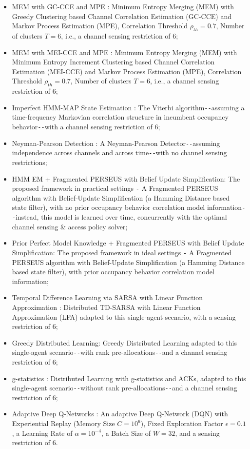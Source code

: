 \documentclass[12pt, draftcls, onecolumn]{IEEEtran}
\begin{document}
\begin{itemize}
    \item MEM with GC-CCE and MPE \cite{WCL:7}: Minimum Entropy Merging (MEM) with Greedy Clustering based Channel Correlation Estimation (GC-CCE) and Markov Process Estimation (MPE), Correlation Threshold $\rho_{th}{=}0.7$, Number of clusters $T{=}6$, i.e., a channel sensing restriction of $6$;
    \item MEM with MEI-CCE and MPE \cite{WCL:7}: Minimum Entropy Merging (MEM) with Minimum Entropy Increment Clustering based Channel Correlation Estimation (MEI-CCE) and Markov Process Estimation (MPE), Correlation Threshold $\rho_{th}{=}0.7$, Number of clusters $T{=}6$, i.e., a channel sensing restriction of $6$;
    \item Imperfect HMM-MAP State Estimation \cite{WCL:6}: The Viterbi algorithm\texttt{-{}-}assuming a time-frequency Markovian correlation structure in incumbent occupancy behavior\texttt{-{}-}with a channel sensing restriction of $6$;
    \item Neyman-Pearson Detection \cite{WCL:11}: A Neyman-Pearson Detector\texttt{-{}-}assuming independence across channels and across time\texttt{-{}-}with no channel sensing restrictions;
    \item HMM EM + Fragmented PERSEUS with Belief Update Simplification: The proposed framework in practical settings \texttt{-} A Fragmented PERSEUS algorithm with Belief-Update Simplification (a Hamming Distance based state filter), with no prior occupancy behavior correlation model information\texttt{-{}-}instead, this model is learned over time, concurrently with the optimal channel sensing \& access policy solver;
    \item Prior Perfect Model Knowledge + Fragmented PERSEUS with Belief Update Simplification: The proposed framework in ideal settings \texttt{-} A Fragmented PERSEUS algorithm with Belief-Update Simplification (a Hamming Distance based state filter), with prior occupancy behavior correlation model information;
    \item Temporal Difference Learning via SARSA with Linear Function Approximation \cite{WCL:5}: Distributed TD-SARSA with Linear Function Approximation (LFA) adapted to this single-agent scenario, with a sensing restriction of $6$;
    \item Greedy Distributed Learning\cite{WCL:MIT}: Greedy Distributed Learning adapted to this single-agent scenario\texttt{-{}-}with rank pre-allocations\texttt{-{}-}and a channel sensing restriction of $6$;
    \item g-statistics \cite{WCL:MIT}: Distributed Learning with g-statistics and ACKs, adapted to this single-agent scenario\texttt{-{}-}without rank pre-allocations\texttt{-{}-}and a channel sensing restriction of $6$;
    \item Adaptive Deep Q-Networks \cite{WCL:DQN}: An adaptive Deep Q-Network (DQN) with Experiential Replay (Memory Size $C{=}10^{6}$), Fixed Exploration Factor $\epsilon{=}0.1$, a Learning Rate of $\alpha{=}10^{-4}$, a Batch Size of $W{=}32$, and a sensing restriction of $6$. 
\end{itemize}
\end{document}
